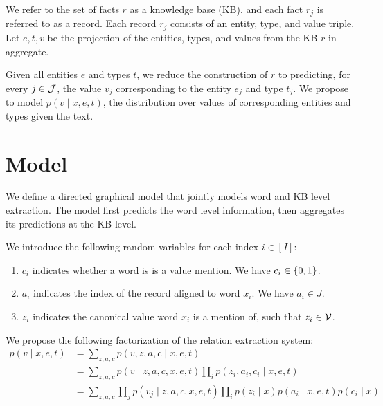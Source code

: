 \documentclass[12pt]{article}
\begin{document}
We refer to the set of facts $r$ as a knowledge base (KB),
and each fact $r_j$ is referred to as a record.
Each record $r_j$ consists of an entity, type, and value triple. 
Let $e,t,v$ be the projection of the entities, types, and values
from the KB $r$ in aggregate.

Given all entities $e$ and types $t$,
we reduce the construction of $r$ to predicting, for every $j\in \mathcal{J}$,
the value $v_j$ corresponding to the entity $e_j$ and type $t_j$.
We propose to model $p(v \mid x, e, t)$,
the distribution over values of corresponding entities and types given the text.

\section{Model}
We define a directed graphical model that jointly models 
word and KB level extraction. 
The model first predicts the word level information,
then aggregates its predictions at the KB level.

We introduce the following random variables for each index $i \in [I]$:
\begin{enumerate}
\item $c_i$ indicates whether a word is is a value mention.
    We have $c_i \in \left\{0,1\right\}$.
\item $a_i$ indicates the index of the record aligned to word $x_i$.
    We have $a_i \in J$.
\item $z_i$ indicates the canonical value word $x_i$ is a mention of,
    such that $z_i \in \mathcal{V}$.
\end{enumerate}

We propose the following factorization of the relation extraction system:
\begin{equation}
\label{eqn:prob}
\begin{aligned}
p(v \mid x,e,t) &= \sum_{z,a,c} p(v,z,a,c\mid x,e,t)\\
&= \sum_{z,a,c} p(v\mid z,a,c,x,e,t) \prod_i p(z_i, a_i, c_i\mid x,e,t)\\
&= \sum_{z,a,c} \prod_j p(v_j\mid z,a,c,x,e,t) \prod_i p(z_i\mid x)p(a_i\mid x,e,t)p(c_i\mid x)\\
\end{aligned}
\end{equation}
\end{document}
